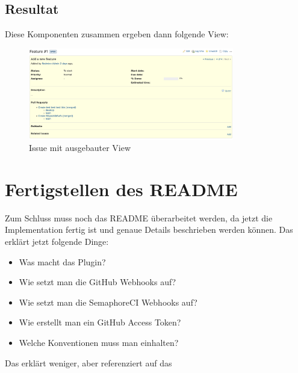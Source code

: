 \newpage
\subsection{Resultat}
Diese Komponenten zusammen ergeben dann folgende View:
\begin{figure}[H]
  \centering
  \includegraphics[width=0.8\textwidth]{images/misc/issue_details.png}
  \caption[Screenshot eines Issues mit ausgebauter View]{Issue mit ausgebauter View}
  \label{fig:issue_details}
\end{figure}

\section{Fertigstellen des README}
Zum Schluss muss noch das README überarbeitet werden, da jetzt die Implementation fertig ist und genaue Details
beschrieben werden können. Das  erklärt jetzt folgende Dinge:
\begin{itemize}
  \item Was macht das Plugin?
  \item Wie setzt man die GitHub Webhooks auf?
  \item Wie setzt man die SemaphoreCI Webhooks auf?
  \item Wie erstellt man ein GitHub Access Token?
  \item Welche Konventionen muss man einhalten?
\end{itemize}
Das  erklärt weniger, aber referenziert auf das 
